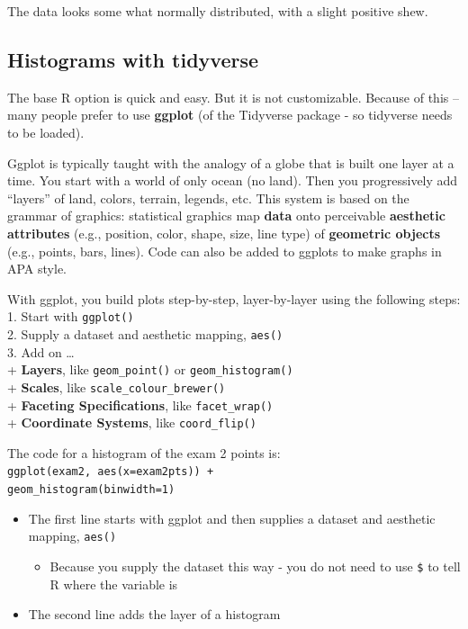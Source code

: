 \documentclass[
]{book}
\providecommand{\tightlist}{%
  \setlength{\itemsep}{0pt}\setlength{\parskip}{0pt}}
\begin{document}
The data looks some what normally distributed, with a slight positive shew.

\hypertarget{histograms-with-tidyverse}{%
\subsection{Histograms with tidyverse}\label{histograms-with-tidyverse}}

The base R option is quick and easy. But it is not customizable. Because of this -- many people prefer to use \textbf{ggplot} (of the Tidyverse package - so tidyverse needs to be loaded).

Ggplot is typically taught with the analogy of a globe that is built one layer at a time. You start with a world of only ocean (no land). Then you progressively add ``layers'' of land, colors, terrain, legends, etc. This system is based on the grammar of graphics: statistical graphics map \textbf{data} onto perceivable \textbf{aesthetic attributes} (e.g., position, color, shape, size, line type) of \textbf{geometric objects} (e.g., points, bars, lines). Code can also be added to ggplots to make graphs in APA style.

With ggplot, you build plots step-by-step, layer-by-layer using the following steps:\\
1. Start with \texttt{ggplot()}\\
2. Supply a dataset and aesthetic mapping, \texttt{aes()}\\
3. Add on \ldots{}\\
+ \textbf{Layers}, like \texttt{geom\_point()} or \texttt{geom\_histogram()}\\
+ \textbf{Scales}, like \texttt{scale\_colour\_brewer()}\\
+ \textbf{Faceting Specifications}, like \texttt{facet\_wrap()}\\
+ \textbf{Coordinate Systems}, like \texttt{coord\_flip()}

The code for a histogram of the exam 2 points is:\\
\texttt{ggplot(exam2,\ aes(x=exam2pts))\ +}~\\
\texttt{geom\_histogram(binwidth=1)}

\begin{itemize}
\tightlist
\item
  The first line starts with ggplot and then supplies a dataset and aesthetic mapping, \texttt{aes()}

  \begin{itemize}
  \tightlist
  \item
    Because you supply the dataset this way - you do not need to use \texttt{\$} to tell R where the variable is\\
  \end{itemize}
\item
  The second line adds the layer of a histogram
\end{itemize}
\end{document}
